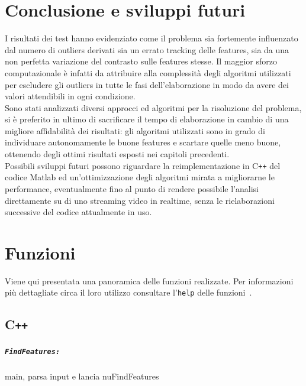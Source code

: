 \documentclass[12pt]{report}
\begin{document}
\chapter{Conclusione e sviluppi futuri}
\noindent I risultati dei test hanno evidenziato come il problema sia fortemente influenzato dal numero di outliers derivati sia un errato tracking delle features, sia da una non perfetta variazione del contrasto sulle features stesse. Il maggior sforzo computazionale \`e infatti da attribuire alla complessit\`a degli algoritmi utilizzati per escludere gli outliers in tutte le fasi dell'elaborazione in modo da avere dei valori attendibili in ogni condizione.\\

\noindent Sono stati analizzati diversi approcci ed algoritmi per la risoluzione del problema, si \`e preferito in ultimo di sacrificare il tempo di elaborazione in cambio di una migliore affidabilit\`a dei risultati: gli algoritmi utilizzati sono in grado di individuare autonomamente le buone features e scartare quelle meno buone, ottenendo degli ottimi risultati esposti nei capitoli precedenti.\\

\noindent Possibili sviluppi futuri possono riguardare la reimplementazione in C\verb|++| del codice Matlab ed un'ottimizzazione degli algoritmi mirata a migliorarne le performance, eventualmente fino al punto di rendere possibile l'analisi direttamente su di uno streaming video in realtime, senza le rielaborazioni successive del codice attualmente in uso.\\





\chapter{Funzioni}

Viene qui presentata una panoramica delle funzioni realizzate. Per informazioni pi\`u dettagliate circa il loro utilizzo consultare l'\verb|help| delle funzioni~\cite{lucaskanade81}.

\section[C++]{C\verb_++_}

\paragraph*{\verb_FindFeatures:_} main, parsa input e lancia nuFindFeatures
\end{document}
